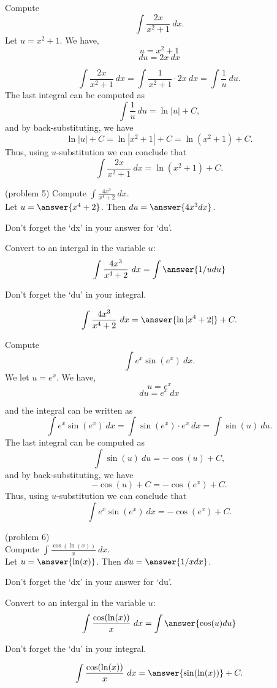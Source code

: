 \documentclass{ximera}
\begin{document}
\begin{example}[example 5] Compute 
\[\int \frac{2x}{x^2 + 1} \ dx.\]
Let $u = x^2 + 1$.  We have,
\[u = x^2 + 1\]
\[du = 2x \ dx\]

\[\int \frac{2x}{x^2 + 1} \ dx = \int \frac{1}{x^2 + 1} \cdot 2x\  dx = \int \frac{1}{u} \ du.\]
The last integral can be computed as 
\[\int \frac{1}{u} \ du = \ln|u| + C,\]
and by back-substituting, we have 
\[\ln|u| + C =  \ln|x^2 + 1| + C=\ln(x^2 + 1) + C.\]
Thus, using $u$-substitution we can conclude that
\[\int \frac{2x}{x^2 + 1} \ dx =  \ln(x^2 + 1) + C.\]
\end{example}


\begin{problem} (problem 5) Compute $\displaystyle{\int \frac{4x^3}{x^4 +2} \ dx}$.\\
Let $u = \answer{x^4 + 2}$. Then $du = \answer{4x^3 dx}$.\\
\begin{hint}
Don't forget the `dx' in your answer for `du'.
\end{hint}
Convert to an intergal in the variable $u$:
\[\int \frac{4x^3}{x^4 +2} \ dx = \int\answer{1/u du}\]
\begin{hint}
Don't forget the `du' in your integral.
\end{hint}

\[\int \frac{4x^3}{x^4 +2} \ dx = \answer{\ln|x^4 +2|} +C.\]
\end{problem}



\begin{example}[example 6] Compute 
\[\int e^x\sin(e^x) \ dx.\]
We let $u = e^x$.  We have,
\[u = e^x\]
\[du = e^x \ dx\]

and the integral can be written as 
\[\int e^x\sin(e^x) \ dx = \int \sin(e^x) \cdot e^x \  dx = \int \sin(u) \ du.\]
The last integral can be computed as 
\[\int \sin(u) \ du = -\cos(u) + C,\]
and by back-substituting, we have 
\[-\cos(u) + C = -\cos(e^x) + C.\]
Thus, using $u$-substitution we can conclude that
\[\int e^x\sin(e^x) \ dx =  -\cos(e^x) + C.\]
\end{example}




\begin{problem}(problem 6)\\
Compute $\displaystyle{\int \frac{\cos(\ln(x))}{x} \ dx}$.\\
Let $u = \answer{\ln(x)}$. Then $du = \answer{1/x dx}$.\\
\begin{hint}
Don't forget the `dx' in your answer for `du'.
\end{hint}
Convert to an intergal in the variable $u$:
\[\int \frac{\cos(\ln(x))}{x} \ dx = \int\answer{\cos(u) du}\]
\begin{hint}
Don't forget the `du' in your integral.
\end{hint}

\[\int \frac{\cos(\ln(x))}{x} \ dx = \answer{\sin(\ln(x))} +C.\]
\end{problem}
\end{document}
